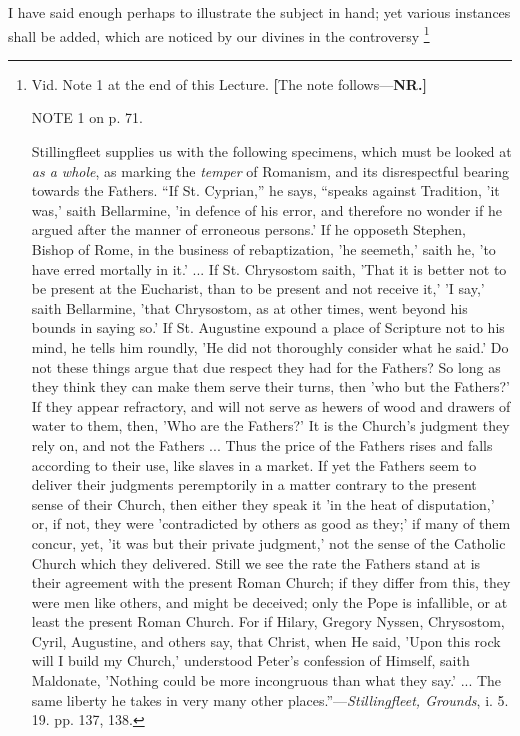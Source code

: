 I have said enough perhaps to illustrate the subject in hand; yet
various instances shall be added, which are noticed by our divines in
the controversy \footnote{Vid. Note 1 at the end of this Lecture. \textbf{[}The note follows—\textbf{NR.]}

NOTE
1 on p. 71.

Stillingfleet supplies us with the following
specimens, which must be looked at \emph{as a whole}, as marking the \emph{temper}
of Romanism, and its disrespectful bearing towards the Fathers.
``If St. Cyprian,'' he says, ``speaks against Tradition,
'it was,' saith Bellarmine, 'in defence of his error, and therefore no
wonder if he argued after the manner of erroneous persons.' If he
opposeth Stephen, Bishop of Rome, in the business of rebaptization,
'he seemeth,' saith he, 'to have erred mortally in it.' ... If St.
Chrysostom saith, 'That it is better not to be present at the
Eucharist, than to be present and not receive it,' 'I say,' saith
Bellarmine, 'that Chrysostom, as at other times, went beyond his
bounds in saying so.' If St. Augustine expound a place of Scripture
not to his mind, he tells him roundly, 'He did not thoroughly
consider what he said.' Do not these things argue that due respect
they had for the Fathers? So long as they think they can make them
serve their turns, then 'who but the Fathers?' If they appear
refractory, and will not serve as hewers of wood and drawers of water
to them, then, 'Who are the Fathers?' It is the Church's judgment they
rely on, and not the Fathers ... Thus the price of the Fathers rises
and falls according to their use, like slaves in a market. If yet the
Fathers seem to deliver their judgments peremptorily in a matter
contrary to the present sense of their Church, then either they speak
it 'in the heat of disputation,' or, if not, they were 'contradicted
by others as good as they;' if many of them concur, yet, 'it was but
their private judgment,' not the sense of the Catholic Church which
they delivered. Still we see the rate the Fathers stand at is their
agreement with the present Roman Church; if they differ from this,
they were men like others, and might be deceived; only the Pope is
infallible, or at least the present Roman Church. For if Hilary,
Gregory Nyssen, Chrysostom, Cyril, Augustine, and others say, that
Christ, when He said, 'Upon this rock will I build my Church,'
understood Peter's confession of Himself, saith Maldonate, 'Nothing
could be more incongruous than what they say.' ... The same liberty he
takes in very many other places.''—\emph{Stillingfleet, Grounds},
i. 5. 19. pp. 137, 138.

}

